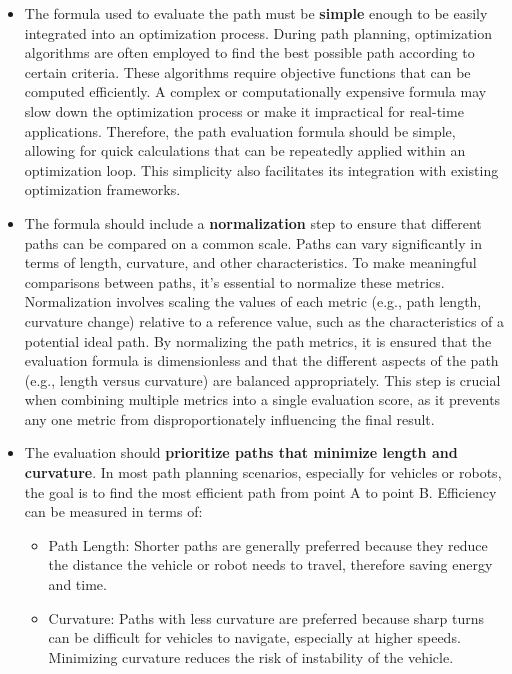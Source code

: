 \begin{itemize}
    \item The formula used to evaluate the path must be \textbf{simple} enough to be easily integrated into an optimization process.
    During path planning, optimization algorithms are often employed to find the best possible path according to certain 
    criteria. These algorithms require objective functions that can be computed efficiently. A complex or computationally 
    expensive formula may slow down the optimization process or make it impractical for real-time applications. 
    Therefore, the path evaluation formula should be simple, allowing for quick calculations that can be repeatedly 
    applied within an optimization loop. This simplicity also facilitates its integration with existing optimization 
    frameworks.
    \item The formula should include a \textbf{normalization} step to ensure that different paths can be compared on a common scale.
    Paths can vary significantly in terms of length, curvature, and other characteristics. To make meaningful 
    comparisons between paths, it’s essential to normalize these metrics. Normalization involves scaling the values of 
    each metric (e.g., path length, curvature change) relative to a reference value, such as the characteristics of 
    a potential ideal path. By normalizing the path metrics, it is ensured that the evaluation formula is 
    dimensionless and that the different aspects of the path (e.g., length versus curvature) are balanced 
    appropriately. This step is crucial when combining multiple metrics into a single evaluation score, as it 
    prevents any one metric from disproportionately influencing the final result.
    \item The evaluation should \textbf{prioritize paths that minimize length and curvature}.  In most path planning scenarios, 
    especially for vehicles or robots, the goal is to find the most efficient path from point A to point B. 
    Efficiency can be measured in terms of:
    \begin{itemize}
        \item Path Length: Shorter paths are generally preferred because they reduce the distance the vehicle or robot 
        needs to travel, therefore saving energy and time.
        \item Curvature: Paths with less curvature are preferred because sharp turns can be difficult for vehicles 
        to navigate, especially at higher speeds. Minimizing curvature reduces the risk of instability of the vehicle.
    \end{itemize}
    
\end{itemize}

